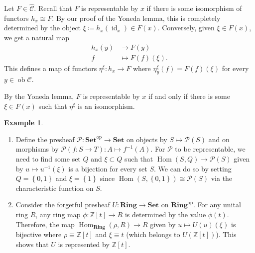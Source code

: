 \documentclass[10pt,letterpaper,cm]{nupset}
\theoremstyle{definition}
\newtheorem{exmp}[definition]{Example}
\theoremstyle{theorem}
\theoremstyle{remark}
\renewcommand{\P}{\mathcal P}
\newcommand{\Z}{\mathbb Z}
\newcommand{\1}{\mathbf{1}}
\renewcommand{\c}{\mathscr{C}}
\newcommand{\0}{\vec 0}
\DeclareMathOperator{\id}{\mathrm{id}}
\DeclareMathOperator{\op}{op}
\DeclareMathOperator{\ob}{ob}
\DeclareMathOperator{\Hom}{Hom}
\begin{document}
Let $F \in \widehat{\c}$. Recall that $F$ is representable by $x$ if there is some isomorphism of functors $h_x \cong F$. By our proof of the Yoneda lemma, this is completely determined by the object $\xi\coloneqq  h_x(\id_x) \in F(x)$. Conversely, given $\xi \in F(x)$, we get a natural map \begin{align*}
h_x(y) &  \to F(y)
\\  f &  \mapsto F(f)(\xi).
\end{align*} This defines a map of functors $\eta^{\xi} : h_x \to F$ where $\eta^{\xi}_y(f) = F(f)(\xi)$ for every $y \in \ob \c$. 

\medskip

 By the Yoneda lemma, $F$ is representable by $x$  if and only if there is some $\xi \in F(x)$ such that $\eta^{\xi}$ is an isomorphism. 

\begin{exmp} $ $
\begin{enumerate}
\item Define the presheaf $\P : \mathbf{Set}^{\op} \to \mathbf{Set}$ on objects by $S \mapsto \P(S)$ and on morphisms by $\P(f : S \to T) : A \mapsto f^{-1}(A).$ For $\P$ to be representable, we need to find some set $Q$ and $\xi \subset Q$ such that $\Hom(S, Q) \to \P(S)$ given by $u \mapsto u^{-1}(\xi)$ is a bijection for every set $S$. We can do so by setting $Q = \left\{0, 1\right\}$ and $\xi = \left\{1\right\}$ since $\Hom(S, \left\{0, 1\right\}) \cong \P(S)$ via the characteristic function on $S$.
\item Consider the forgetful presheaf $U: \mathbf{Ring} \to \mathbf{Set}$ on  $\mathbf{Ring}^{\op}$.  For any unital ring $R$, any ring map $\phi : \Z\left[t\right] \to R$ is determined by the value $\phi(t)$. Therefore, the map $\Hom_{\mathbf{Ring}}( \rho, R) \to R$ given by $u \mapsto U(u)(\xi)$ is bijective where $\rho \equiv \Z\left[t\right]$ and $\xi \equiv t$ (which belongs to $U(\Z\left[t\right])$). This shows that $U$ is represented by $\Z\left[t\right]$.
\end{enumerate}
\end{exmp}
\end{document}
